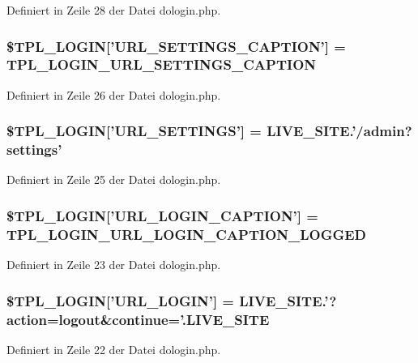 Definiert in Zeile 28 der Datei dologin.php.
\subsubsection{\setlength{\rightskip}{0pt plus 5cm}\$TPL\_\-LOGIN['URL\_\-SETTINGS\_\-CAPTION'] = {\bf TPL\_\-LOGIN\_\-URL\_\-SETTINGS\_\-CAPTION}}\label{dologin_8php_aa25676ffa58b6db277ce1d3e5e9dacd}




Definiert in Zeile 26 der Datei dologin.php.
\subsubsection{\setlength{\rightskip}{0pt plus 5cm}\$TPL\_\-LOGIN['URL\_\-SETTINGS'] = LIVE\_\-SITE.'/admin?settings'}\label{dologin_8php_b7c970d1133f8ca986a18bf2bc90328b}




Definiert in Zeile 25 der Datei dologin.php.
\subsubsection{\setlength{\rightskip}{0pt plus 5cm}\$TPL\_\-LOGIN['URL\_\-LOGIN\_\-CAPTION'] = {\bf TPL\_\-LOGIN\_\-URL\_\-LOGIN\_\-CAPTION\_\-LOGGED}}\label{dologin_8php_9ce7a38cdc82022a635cfb465faecb72}




Definiert in Zeile 23 der Datei dologin.php.
\subsubsection{\setlength{\rightskip}{0pt plus 5cm}\$TPL\_\-LOGIN['URL\_\-LOGIN'] = LIVE\_\-SITE.'?action=logout\&continue='.{\bf LIVE\_\-SITE}}\label{dologin_8php_7327a9341ced66c10812d410a9cc13f6}




Definiert in Zeile 22 der Datei dologin.php.